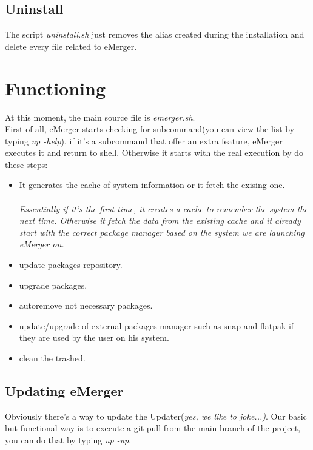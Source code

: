 \documentclass{article}
\begin{document}
\subsection{Uninstall}
The script \textit{uninstall.sh} just removes the alias created during the installation and delete every file related to eMerger.

\section{Functioning}
At this moment, the main source file is \textit{emerger.sh}. \\
First of all, eMerger starts checking for subcommand(you can view the list by typing \textit{up -help}). if it's a subcommand that offer an extra feature, eMerger executes it and return to shell.
Otherwise it starts with the real execution by do these steps:\\
\begin{itemize}
\item It generates the cache of system information or it fetch the exising one. \\ \\
\textit{Essentially if it's the first time, it creates a cache to remember the system the next time. Otherwise it fetch the data from the existing cache and it already start with the correct package manager based on the system we are launching eMerger on.}
\item update packages repository.
\item upgrade packages.
\item autoremove not necessary packages.
\item update/upgrade of external packages manager such as snap and flatpak if they are used by the user on his system.
\item clean the trashed.
\end{itemize}
\subsection{Updating eMerger}
Obviously there's a way to update the Updater(\textit{yes, we like to joke...)}. Our basic but functional way is to execute a git pull from the main branch of the project, you can do that by typing \textit{up -up}.
\end{document}
